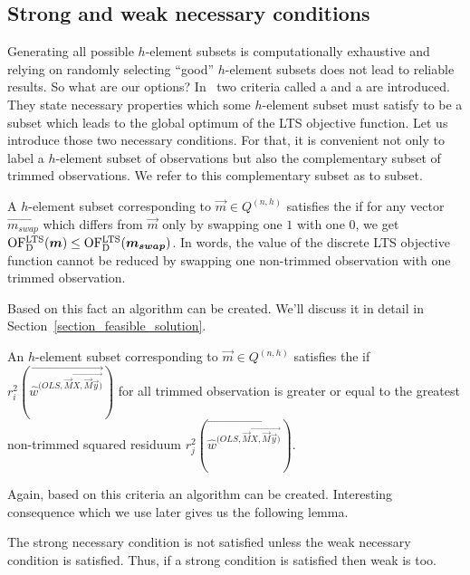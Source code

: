 \subsection{Strong and weak necessary conditions}
Generating all possible $h$-element subsets is computationally exhaustive and relying on randomly selecting  ``good'' $h$-element subsets does not lead to reliable results. So what are our options? In~\cite{hawkins1999improved} two criteria called a  and a  are introduced. They state necessary properties which some $h$-element subset must satisfy to be a subset which leads to the global optimum of the LTS objective function. Let us introduce those two necessary conditions. For that, it is convenient not only to label a $h$-element subset of  observations but also the complementary subset of trimmed observations. We refer to this complementary subset as to  subset.

\begin{definition} \label{strong_condition}
 A $h$-element subset corresponding to $\vec{m} \in Q^{(n, h)}$ satisfies  the  if for any vector $\vec{m_{swap}}$ which differs from $\vec{m}$ only by swapping one $1$ with one $0$, we get  $\operatorname{OF^{LTS}_D}(\boldsymbol{m}) \leq \operatorname{OF^{LTS}_D}(\boldsymbol{m_{swap}})$. In words, the value of the discrete LTS objective function cannot be reduced by swapping one non-trimmed observation with one trimmed observation.
\end{definition}

Based on this fact an algorithm can be created. We'll discuss it in detail in Section~\ref{section_feasible_solution}.

\begin{definition}
An $h$-element subset corresponding to $\vec{m} \in Q^{(n, h)}$ satisfies the  if 
$r_i^2(\vec{\hat{w}^{(OLS, \vec{M}\vec{X, \vec{M}\vec{y})} } })$ for all trimmed observation is greater or equal to the greatest non-trimmed squared residuum $r_j^2(\vec{\hat{w}^{(OLS, \vec{M}\vec{X, \vec{M}\vec{y})} }})$.
\end{definition}    
Again, based on this criteria an algorithm can be created. Interesting consequence which we use later gives us the following lemma.

\begin{lemma} \label{lemma_conditions}
    The strong necessary condition is not satisfied unless the weak necessary condition is satisfied. Thus, if a strong condition is satisfied then weak is too. 
\end{lemma}

